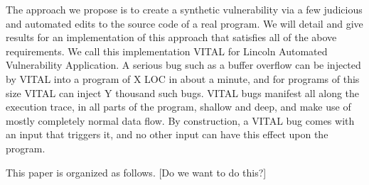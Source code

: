 The approach we propose is to create a synthetic vulnerability via a few judicious and automated edits to the source code of a real program.
We will detail and give results for an implementation of this approach that satisfies all of the above requirements.
We call this implementation VITAL for Lincoln Automated Vulnerability Application.
A serious bug such as a buffer overflow can be injected by VITAL into a program of X LOC in about a minute, and for programs of this size VITAL can inject  Y thousand such bugs.
VITAL bugs manifest all along the execution trace, in all parts of the program, shallow and deep, and make use of mostly completely normal data flow.
By construction, a VITAL bug comes with an input that triggers it, and no other input can have this effect upon the program.

This paper is organized as follows. 
[Do we want to do this?]
